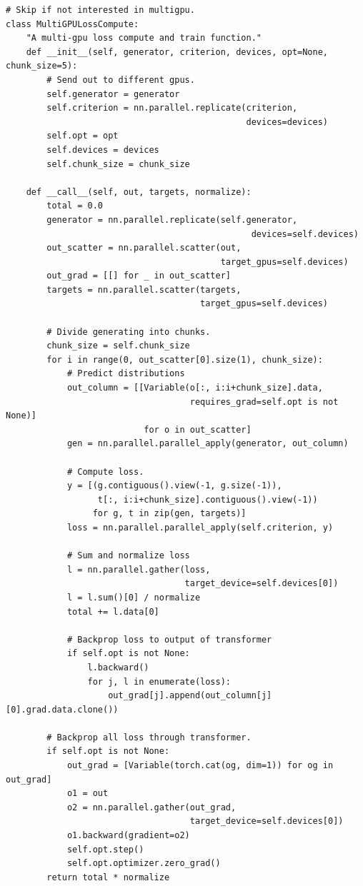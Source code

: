 \begin{Verbatim}
# Skip if not interested in multigpu.
class MultiGPULossCompute:
    "A multi-gpu loss compute and train function."
    def __init__(self, generator, criterion, devices, opt=None, chunk_size=5):
        # Send out to different gpus.
        self.generator = generator
        self.criterion = nn.parallel.replicate(criterion, 
                                               devices=devices)
        self.opt = opt
        self.devices = devices
        self.chunk_size = chunk_size
        
    def __call__(self, out, targets, normalize):
        total = 0.0
        generator = nn.parallel.replicate(self.generator, 
                                                devices=self.devices)
        out_scatter = nn.parallel.scatter(out, 
                                          target_gpus=self.devices)
        out_grad = [[] for _ in out_scatter]
        targets = nn.parallel.scatter(targets, 
                                      target_gpus=self.devices)

        # Divide generating into chunks.
        chunk_size = self.chunk_size
        for i in range(0, out_scatter[0].size(1), chunk_size):
            # Predict distributions
            out_column = [[Variable(o[:, i:i+chunk_size].data, 
                                    requires_grad=self.opt is not None)] 
                           for o in out_scatter]
            gen = nn.parallel.parallel_apply(generator, out_column)

            # Compute loss. 
            y = [(g.contiguous().view(-1, g.size(-1)), 
                  t[:, i:i+chunk_size].contiguous().view(-1)) 
                 for g, t in zip(gen, targets)]
            loss = nn.parallel.parallel_apply(self.criterion, y)

            # Sum and normalize loss
            l = nn.parallel.gather(loss, 
                                   target_device=self.devices[0])
            l = l.sum()[0] / normalize
            total += l.data[0]

            # Backprop loss to output of transformer
            if self.opt is not None:
                l.backward()
                for j, l in enumerate(loss):
                    out_grad[j].append(out_column[j][0].grad.data.clone())

        # Backprop all loss through transformer.            
        if self.opt is not None:
            out_grad = [Variable(torch.cat(og, dim=1)) for og in out_grad]
            o1 = out
            o2 = nn.parallel.gather(out_grad, 
                                    target_device=self.devices[0])
            o1.backward(gradient=o2)
            self.opt.step()
            self.opt.optimizer.zero_grad()
        return total * normalize
\end{Verbatim}

